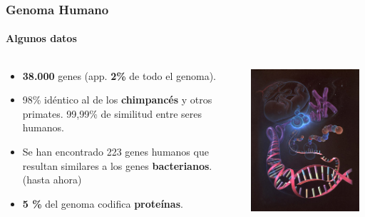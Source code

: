 \begin{frame}
\frametitle{Genoma Humano}
\framesubtitle{Algunos datos}
\begin{columns}
\begin{column}{0.7\textwidth}
	\begin{itemize}
	    \item \textbf{38.000} genes (app. \textbf{2\%} de todo el genoma).
	    \item 98\% idéntico al de los \textbf{chimpancés} y otros primates. 99,99\% de
	    similitud entre seres humanos. 
	    \item Se han encontrado 223 genes humanos que resultan similares a los
	    genes \textbf{bacterianos}. (hasta ahora)
	    \item \textbf{5 \%} del genoma codifica \textbf{proteínas}.
	\end{itemize}
\end{column}
\begin{column}{0.3\textwidth}
\begin{center}
	\includegraphics[width=0.95\textwidth]{img/genoma_humano.jpg}\\
\end{center}
\end{column}
\end{columns}
\end{frame}

